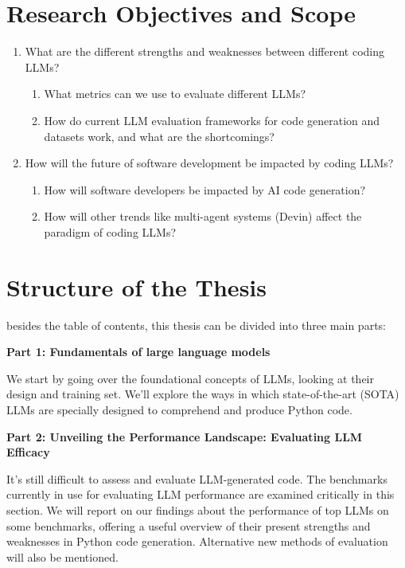 \section{Research Objectives and Scope}

\begin{enumerate}
  \item What are the different strengths and weaknesses between different coding LLMs?
    \begin{enumerate}
      \item What metrics can we use to evaluate different LLMs?
      \item How do current LLM evaluation frameworks for code generation and datasets work, and what are the shortcomings?
    \end{enumerate}
  \item How will the future of software development be impacted by coding LLMs?
    \begin{enumerate}
      \item How will software developers be impacted by AI code generation?
      \item How will other trends like multi-agent systems (Devin) affect the paradigm of coding LLMs?
    \end{enumerate}
\end{enumerate}

\section{Structure of the Thesis}
besides the table of contents, this thesis can be divided into three main parts:

\textbf{Part 1: Fundamentals of large language models}

We start by going over the foundational concepts of LLMs, looking at their design and training set. We'll explore the ways in which state-of-the-art (SOTA) LLMs are specially designed to comprehend and produce Python code.

\textbf{Part 2: Unveiling the Performance Landscape: Evaluating LLM Efficacy}

It's still difficult to assess and evaluate LLM-generated code. The benchmarks currently in use for evaluating LLM performance are examined critically in this section.  We will report on our findings about the performance of top LLMs on some benchmarks, offering a useful overview of their present strengths and weaknesses in Python code generation. Alternative new methods of evaluation will also be mentioned.

